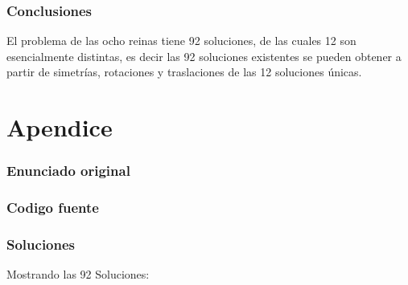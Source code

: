 \documentclass[a4paper,11pt]{article}
\begin{document}
\FloatBarrier

\section{Conclusiones}

  El problema de las ocho reinas tiene 92 soluciones, de las cuales 12 son 
  esencialmente distintas, es decir las 92 soluciones existentes se pueden 
  obtener a partir de simetrías, rotaciones y traslaciones de las 12 soluciones 
  únicas.

\clearpage

\part{Apendice}
\appendix

\section{Enunciado original}\label{sec:enunciado}


\clearpage
\section{Codigo fuente}\label{sec:source}
\clearpage
{}



\clearpage
\section{Soluciones}\label{sec:source}

Mostrando las 92 Soluciones:

\end{document}
